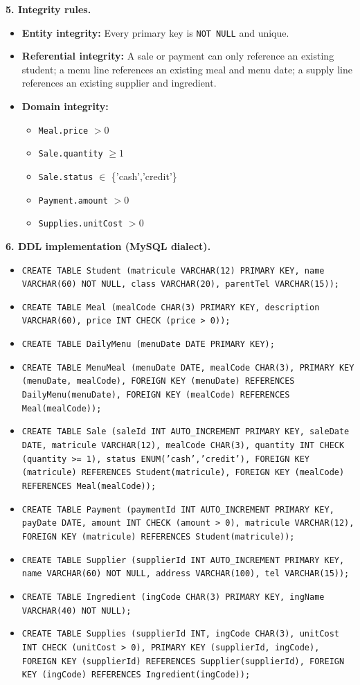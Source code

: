 \documentclass[11pt]{article}
\begin{document}
\textbf{5. Integrity rules.}\par
\begin{itemize}
\item \textbf{Entity integrity:} Every primary key is \texttt{NOT NULL} and unique.
\item \textbf{Referential integrity:} A sale or payment can only reference an existing student; a menu line references an existing meal and menu date; a supply line references an existing supplier and ingredient.
\item \textbf{Domain integrity:}
\begin{itemize}
\item \texttt{Meal.price} $> 0$
\item \texttt{Sale.quantity} $\geq 1$
\item \texttt{Sale.status} $\in$ \{'cash','credit'\}
\item \texttt{Payment.amount} $> 0$
\item \texttt{Supplies.unitCost} $> 0$
\end{itemize}
\end{itemize}

\textbf{6. DDL implementation (MySQL dialect).}\par
\begin{itemize}
\item \texttt{CREATE TABLE Student (matricule VARCHAR(12) PRIMARY KEY, name VARCHAR(60) NOT NULL, class VARCHAR(20), parentTel VARCHAR(15));}
\item \texttt{CREATE TABLE Meal (mealCode CHAR(3) PRIMARY KEY, description VARCHAR(60), price INT CHECK (price > 0));}
\item \texttt{CREATE TABLE DailyMenu (menuDate DATE PRIMARY KEY);}
\item \texttt{CREATE TABLE MenuMeal (menuDate DATE, mealCode CHAR(3), PRIMARY KEY (menuDate, mealCode), FOREIGN KEY (menuDate) REFERENCES DailyMenu(menuDate), FOREIGN KEY (mealCode) REFERENCES Meal(mealCode));}
\item \texttt{CREATE TABLE Sale (saleId INT AUTO\_INCREMENT PRIMARY KEY, saleDate DATE, matricule VARCHAR(12), mealCode CHAR(3), quantity INT CHECK (quantity >= 1), status ENUM('cash','credit'), FOREIGN KEY (matricule) REFERENCES Student(matricule), FOREIGN KEY (mealCode) REFERENCES Meal(mealCode));}
\item \texttt{CREATE TABLE Payment (paymentId INT AUTO\_INCREMENT PRIMARY KEY, payDate DATE, amount INT CHECK (amount > 0), matricule VARCHAR(12), FOREIGN KEY (matricule) REFERENCES Student(matricule));}
\item \texttt{CREATE TABLE Supplier (supplierId INT AUTO\_INCREMENT PRIMARY KEY, name VARCHAR(60) NOT NULL, address VARCHAR(100), tel VARCHAR(15));}
\item \texttt{CREATE TABLE Ingredient (ingCode CHAR(3) PRIMARY KEY, ingName VARCHAR(40) NOT NULL);}
\item \texttt{CREATE TABLE Supplies (supplierId INT, ingCode CHAR(3), unitCost INT CHECK (unitCost > 0), PRIMARY KEY (supplierId, ingCode), FOREIGN KEY (supplierId) REFERENCES Supplier(supplierId), FOREIGN KEY (ingCode) REFERENCES Ingredient(ingCode));}
\end{itemize}
\end{document}
